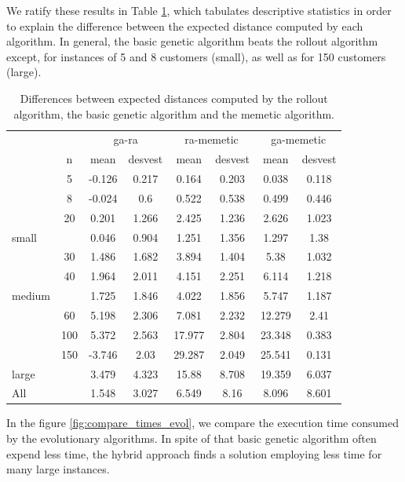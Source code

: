 We ratify these results in Table \ref{tb:diferences_expected_distance}, which tabulates descriptive statistics in order to explain the difference between the expected distance computed by each algorithm. In general, the basic genetic algorithm beats the rollout algorithm except, for instances of 5 and 8 customers (small), as well as for 150 customers (large).

\begin{table}
\begin{tabular}{l c c c c c c c}
 &  & \multicolumn{2}{c}{ga-ra} & \multicolumn{2}{c}{ra-memetic}  & \multicolumn{2}{c}{ga-memetic}\\
\cline{3-8}
 & n & mean & desvest & mean & desvest & mean & desvest\\
\hline
 & 5 & -0.126 & 0.217 & 0.164 & 0.203 & 0.038 & 0.118\\
 & 8 & -0.024 & 0.6 & 0.522 & 0.538 & 0.499 & 0.446\\
 & 20 & 0.201 & 1.266 & 2.425 & 1.236 & 2.626 & 1.023\\
\hline
small &  & 0.046 & 0.904 & 1.251 & 1.356 & 1.297 & 1.38\\
\hline
 & 30 & 1.486 & 1.682 & 3.894 & 1.404 & 5.38 & 1.032\\
 & 40 & 1.964 & 2.011 & 4.151 & 2.251 & 6.114 & 1.218\\
\hline
medium &  & 1.725 & 1.846 & 4.022 & 1.856 & 5.747 & 1.187\\
\hline
 & 60 & 5.198 & 2.306 & 7.081 & 2.232 & 12.279 & 2.41\\
 & 100 & 5.372 & 2.563 & 17.977 & 2.804 & 23.348 & 0.383\\
 & 150 & -3.746 & 2.03 & 29.287 & 2.049 & 25.541 & 0.131\\
\hline
large &  & 3.479 & 4.323 & 15.88 & 8.708 & 19.359 & 6.037\\
\hline
All &  & 1.548 & 3.027 & 6.549 & 8.16 & 8.096 & 8.601\\
\hline
\end{tabular}
\caption{Differences between expected distances computed by the rollout algorithm, the basic genetic algorithm and the memetic algorithm.}\label{tb:diferences_expected_distance}
\end{table}

In the figure \ref{fig:compare_times_evol}, we compare the execution time consumed by the evolutionary algorithms. In spite of that basic genetic algorithm often expend less time, the hybrid approach finds a solution employing less time for many large instances.


